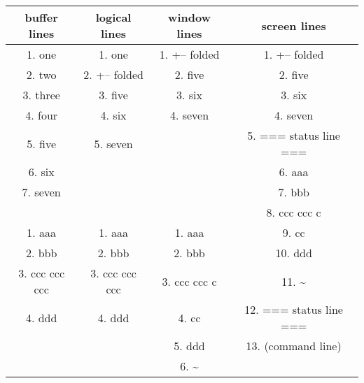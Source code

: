 \begin{center}
				\begin{tabular}{|c|c|c|c|}
								buffer lines    & logical lines  & window lines       & screen lines \\ \hline
								1. one          & 1. one         & 1. +-- folded      & 1.  +-- folded\\
								2. two          & 2. +-- folded  & 2. five            & 2.  five\\
								3. three        & 3. five        & 3. six             & 3.  six\\
								4. four         & 4. six         & 4. seven           & 4.  seven\\
								5. five         & 5. seven       &                    & 5.  === status line ===\\
								6. six          &                &                    & 6.  aaa\\
								7. seven        &                &                    & 7.  bbb\\
																&                &                    & 8.  ccc ccc c\\
								1. aaa          & 1. aaa         & 1. aaa             & 9.  cc\\
								2. bbb          & 2. bbb         & 2. bbb             & 10. ddd\\
								3. ccc ccc ccc  & 3. ccc ccc ccc & 3. ccc ccc c       & 11. \textasciitilde \\
								4. ddd          & 4. ddd         & 4. cc              & 12. === status line ===\\
																&                & 5. ddd             & 13. (command line)\\
																&                & 6. \textasciitilde & \\
				\end{tabular}
\end{center}
\clearpage

